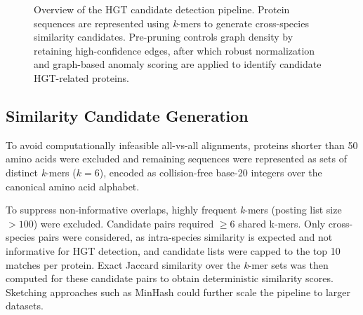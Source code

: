 \documentclass[11pt]{article}
\begin{document}
\begin{figure}[p]
\centering
{}
\caption{Overview of the HGT candidate detection pipeline. Protein sequences are represented using \textit{k}-mers to
generate cross-species similarity candidates. Pre-pruning controls graph density by retaining high-confidence
edges, after which robust normalization and graph-based anomaly scoring are applied to identify candidate
HGT-related proteins.}
\label{fig:pipeline_overview}
\end{figure}

\subsection{Similarity Candidate Generation}
To avoid computationally infeasible all-vs-all alignments, proteins shorter than 50 amino acids were excluded and remaining sequences were represented as sets of distinct \textit{k}-mers ($k=6$), encoded as collision-free base-20 integers over the canonical amino acid alphabet\cite{Sims2009,Haubold2014}.

To suppress non-informative overlaps, highly frequent \textit{k}-mers (posting list size $>100$) were excluded. Candidate pairs required $\ge6$ shared k-mers. Only cross-species pairs were considered, as intra-species similarity is expected and not informative for HGT detection, and candidate lists were capped to the top 10 matches per protein. Exact Jaccard similarity over the \textit{k}-mer sets was then computed for these candidate pairs to obtain deterministic similarity scores. Sketching approaches such as MinHash could further scale the pipeline to larger datasets\cite{Broder1997,Ondov2016}.
\end{document}
